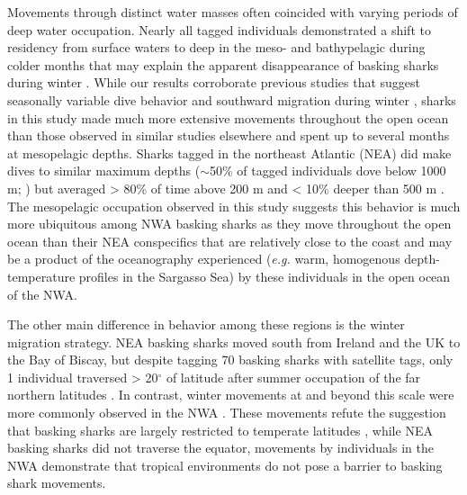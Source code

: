 Movements through distinct water masses often coincided with varying periods of deep water occupation. Nearly all tagged individuals demonstrated a shift to residency from surface waters to deep in the meso- and bathypelagic during colder months that may explain the apparent disappearance of basking sharks during winter \citep{Parker1954}. While our results corroborate previous studies that suggest seasonally variable dive behavior \citep{Sims2003} and southward migration during winter \citep{Doherty2017}, sharks in this study made much more extensive movements throughout the open ocean than those observed in similar studies elsewhere \citep{Doherty2017} and spent up to several months at mesopelagic depths. Sharks tagged in the northeast Atlantic (NEA) did make dives to similar maximum depths ($\sim$50\% of tagged individuals dove below 1000 m; \citealt{Doherty2017}) but averaged > 80\% of time above 200 m and < 10\% deeper than 500 m \citep{Sims2003, Doherty2017}. The mesopelagic occupation observed in this study suggests this behavior is much more ubiquitous among NWA basking sharks as they move throughout the open ocean than their NEA conspecifics that are relatively close to the coast and may be a product of the oceanography experienced (\emph{e.g.} warm, homogenous depth-temperature profiles in the Sargasso Sea) by these individuals in the open ocean of the NWA. 

The other main difference in behavior among these regions is the winter migration strategy. NEA basking sharks moved south from Ireland and the UK to the Bay of Biscay, but despite tagging 70 basking sharks with satellite tags, only 1 individual traversed > 20$^{\circ}$ of latitude after summer occupation of the far northern latitudes \citep{Doherty2017}. In contrast, winter movements at and beyond this scale were more commonly observed in the NWA \citep[][ and this study]{Skomal2009}. These movements refute the suggestion that basking sharks are largely restricted to temperate latitudes \citep{Sims1999,Sims2003,Gore2008,Doherty2017}, while NEA basking sharks did not traverse the equator, movements by individuals in the NWA demonstrate that tropical environments do not pose a barrier to basking shark movements.

